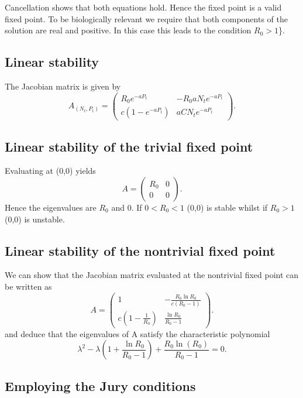 \documentclass[
  letterpaper,
  DIV=11,
  numbers=noendperiod]{scrreprt}
\begin{document}
Cancellation shows that both equations hold. Hence the fixed point is a
valid fixed point. To be biologically relevant we require that both
components of the solution are real and positive. In this case this
leads to the condition \(R_0>1\)\}.

\hypertarget{linear-stability-2}{%
\subsection{Linear stability}\label{linear-stability-2}}

The Jacobian matrix is given by \[
A_{(N_t,P_t)}= \left(\begin{array}{cc}
R_0e^{-aP_t}&-R_0aN_te^{-aP_t} \\ c(1-e^{-aP_t})&aCN_te^{-aP_t} \end{array}\right).
\]

\hypertarget{linear-stability-of-the-trivial-fixed-point}{%
\subsection{Linear stability of the trivial fixed
point}\label{linear-stability-of-the-trivial-fixed-point}}

Evaluating at (0,0) yields \[
A= \left(\begin{array}{cc}
R_0 & 0 \\ 0 & 0 \end{array}\right).
\] Hence the eigenvalues are \(R_0\) and 0. If \(0<R_0<1\) (0,0) is
stable whilst if \(R_0>1\) (0,0) is unstable.

\hypertarget{linear-stability-of-the-nontrivial-fixed-point}{%
\subsection{Linear stability of the nontrivial fixed
point}\label{linear-stability-of-the-nontrivial-fixed-point}}

We can show that the Jacobian matrix evaluated at the nontrivial fixed
point can be written as \[
A= \left(\begin{array}{cc}
1&-\frac{R_0 \ln R_0}{c(R_0-1)} \\ c(1-\frac{1}{R_0})&\frac{\ln R_0}{R_0-1} \end{array}\right) .
\] and deduce that the eigenvalues of A satisfy the characteristic
polynomial \[
\lambda^2 - \lambda\left(1+\frac{\ln R_0}{R_0-1}\right)+ \frac{R_0\ln(R_0)}{R_0-1}=0.
\]

\hypertarget{employing-the-jury-conditions}{%
\subsection{Employing the Jury
conditions}\label{employing-the-jury-conditions}}
\end{document}
